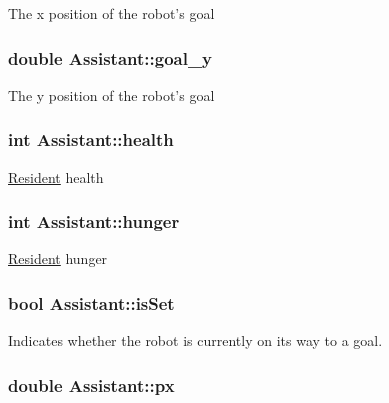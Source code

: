 The x position of the robot's goal \hypertarget{classAssistant_a1b6ce5d7c3124140be8d351c847fe91c}{
\subsubsection[{goal\-\_\-y}]{\setlength{\rightskip}{0pt plus 5cm}double Assistant\-::goal\-\_\-y\hspace{0.3cm}{\ttfamily [protected]}}}\label{classAssistant_a1b6ce5d7c3124140be8d351c847fe91c}
The y position of the robot's goal \hypertarget{classAssistant_a13877ed73a684f59171c686186110870}{
\subsubsection[{health}]{\setlength{\rightskip}{0pt plus 5cm}int Assistant\-::health\hspace{0.3cm}{\ttfamily [protected]}}}\label{classAssistant_a13877ed73a684f59171c686186110870}
\hyperlink{classResident}{Resident} health \hypertarget{classAssistant_ad109fd18cc762f9b9f7e64b626ec5d48}{
\subsubsection[{hunger}]{\setlength{\rightskip}{0pt plus 5cm}int Assistant\-::hunger\hspace{0.3cm}{\ttfamily [protected]}}}\label{classAssistant_ad109fd18cc762f9b9f7e64b626ec5d48}
\hyperlink{classResident}{Resident} hunger \hypertarget{classAssistant_a939484adfb9673d2608282124ef348b9}{
\subsubsection[{is\-Set}]{\setlength{\rightskip}{0pt plus 5cm}bool Assistant\-::is\-Set\hspace{0.3cm}{\ttfamily [protected]}}}\label{classAssistant_a939484adfb9673d2608282124ef348b9}
Indicates whether the robot is currently on its way to a goal. \hypertarget{classAssistant_a694fdaa5fb378340c42b7f75716cd1ce}{
\subsubsection[{px}]{\setlength{\rightskip}{0pt plus 5cm}double Assistant\-::px\hspace{0.3cm}{\ttfamily [protected]}}}\label{classAssistant_a694fdaa5fb378340c42b7f75716cd1ce}

